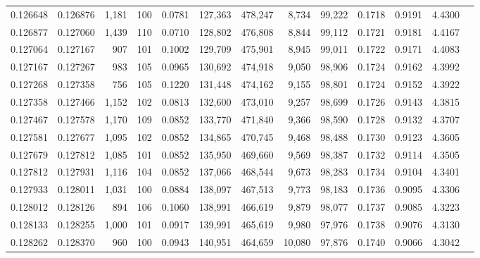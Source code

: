 \begin{tabular}{rrrrrrrrrrrrr}
0.126648 & 0.126876 & 1,181 & 100 &                                     0.0781 & 127,363 & 478,247 &   8,734 &  99,222 & 0.1718 & 0.9191 & 4.4300 \\
0.126877 & 0.127060 & 1,439 & 110 &                                     0.0710 & 128,802 & 476,808 &   8,844 &  99,112 & 0.1721 & 0.9181 & 4.4167 \\
0.127064 & 0.127167 &   907 & 101 &                                     0.1002 & 129,709 & 475,901 &   8,945 &  99,011 & 0.1722 & 0.9171 & 4.4083 \\
0.127167 & 0.127267 &   983 & 105 &                                     0.0965 & 130,692 & 474,918 &   9,050 &  98,906 & 0.1724 & 0.9162 & 4.3992 \\
0.127268 & 0.127358 &   756 & 105 &                                     0.1220 & 131,448 & 474,162 &   9,155 &  98,801 & 0.1724 & 0.9152 & 4.3922 \\
0.127358 & 0.127466 & 1,152 & 102 &                                     0.0813 & 132,600 & 473,010 &   9,257 &  98,699 & 0.1726 & 0.9143 & 4.3815 \\
0.127467 & 0.127578 & 1,170 & 109 &                                     0.0852 & 133,770 & 471,840 &   9,366 &  98,590 & 0.1728 & 0.9132 & 4.3707 \\
0.127581 & 0.127677 & 1,095 & 102 &                                     0.0852 & 134,865 & 470,745 &   9,468 &  98,488 & 0.1730 & 0.9123 & 4.3605 \\
0.127679 & 0.127812 & 1,085 & 101 &                                     0.0852 & 135,950 & 469,660 &   9,569 &  98,387 & 0.1732 & 0.9114 & 4.3505 \\
0.127812 & 0.127931 & 1,116 & 104 &                                     0.0852 & 137,066 & 468,544 &   9,673 &  98,283 & 0.1734 & 0.9104 & 4.3401 \\
0.127933 & 0.128011 & 1,031 & 100 &                                     0.0884 & 138,097 & 467,513 &   9,773 &  98,183 & 0.1736 & 0.9095 & 4.3306 \\
0.128012 & 0.128126 &   894 & 106 &                                     0.1060 & 138,991 & 466,619 &   9,879 &  98,077 & 0.1737 & 0.9085 & 4.3223 \\
0.128133 & 0.128255 & 1,000 & 101 &                                     0.0917 & 139,991 & 465,619 &   9,980 &  97,976 & 0.1738 & 0.9076 & 4.3130 \\
0.128262 & 0.128370 &   960 & 100 &                                     0.0943 & 140,951 & 464,659 &  10,080 &  97,876 & 0.1740 & 0.9066 & 4.3042 \\

\end{tabular}
